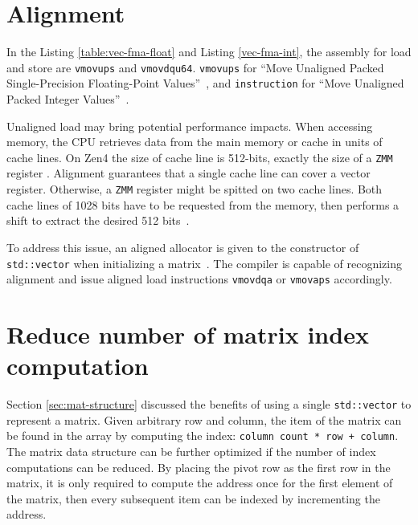 \documentclass[logo,bsc,singlespacing,parskip]{infthesis}
\newcommand{\zmm}{\texttt{ZMM}}
\begin{document}
\section{Alignment}
In the Listing \ref{table:vec-fma-float} and Listing \ref{vec-fma-int}, the
assembly for load and store are \texttt{vmovups} and \texttt{vmovdqu64}. 
\texttt{vmovups} for
``Move Unaligned Packed Single-Precision Floating-Point Values''~\cite{instruction},
and \texttt{instruction} for 
``Move Unaligned Packed Integer Values''~\cite{vmovdqu64}. 

Unaligned load may bring potential performance impacts. When accessing memory,
the CPU retrieves data from the main memory or cache in units of cache lines. On
Zen4 the size of cache line is 512-bits, exactly the size of a \zmm{} register
\cite{AMDManual}. Alignment guarantees that a single cache line can cover a
vector register. Otherwise, a \zmm{} register might be spitted on two cache lines.
Both cache lines of 1028 bits have to be requested from the memory, then
performs a shift to extract the desired 512 bits~\cite{Unaligned}.  

To address this issue, an aligned allocator is given to the constructor of
\texttt{std::vector} when initializing a matrix~\cite{FPL2}. 
 The compiler is capable of recognizing alignment
and issue aligned load instructions \texttt{vmovdqa} or \texttt{vmovaps}
accordingly. 

\section{Reduce number of matrix index computation}
\label{sec:optmz-get-index}

Section \ref{sec:mat-structure} discussed the benefits of using a single
\texttt{std::vector} to represent a matrix. Given arbitrary row and column, the
item of the matrix can be found in the array by computing the index:
\texttt{column count * row + column}. The matrix data structure can be further
optimized if the number of index computations can be reduced. By placing the
pivot row as the first row in the matrix, it is only required to compute the
address once for the first element of the matrix, then every subsequent item can
be indexed by incrementing the address. 

\end{document}
